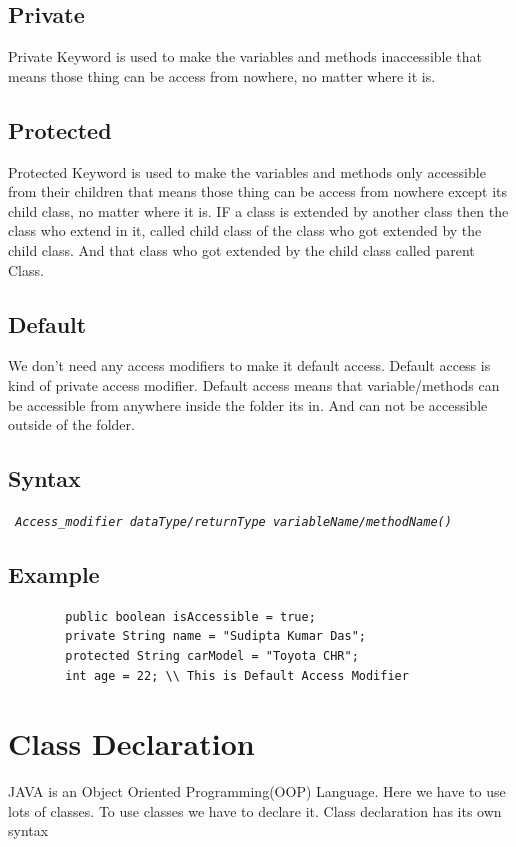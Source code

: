 \documentclass[A4 paper,openany]{book}  %
\begin{document}
\subsection{Private}
Private Keyword is used to make the variables and methods inaccessible that means those thing can be access from nowhere, no matter where it is.
% 
%
\subsection{Protected}
Protected Keyword is used to make the variables and methods only accessible from their children that means those thing can be access from nowhere except its child class,
no matter where it is. IF a class is extended by another class then the class who extend in it, called child class of the class who got extended by the child class.
And that class who got extended by the child class called parent Class.
% 
%
\subsection{Default}
We don't need any access modifiers to make it default access. Default access is kind of private access modifier. Default access means that variable/methods can be accessible
from anywhere inside the folder its in. And can not be accessible outside of the folder.
% 
%
\subsection{Syntax}
\begin{center}
    \tt{
        \textit{Access\_modifier dataType/returnType variableName/methodName()}
    }
\end{center}
% 
% 
\subsection{Example}
\begin{center}
    \begin{verbatim}
        public boolean isAccessible = true;
        private String name = "Sudipta Kumar Das";
        protected String carModel = "Toyota CHR";
        int age = 22; \\ This is Default Access Modifier
    \end{verbatim}
\end{center}
% 
% 
\section{Class Declaration}
JAVA is an Object Oriented Programming(OOP) Language. Here we have to use lots of classes. To use classes we have to declare it. Class declaration has its own syntax
% 
% 
\end{document}
